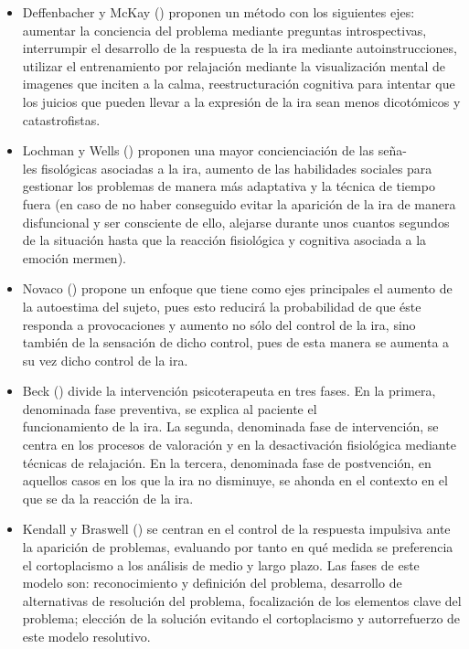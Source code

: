 \begin{itemize}
    \item Deffenbacher y McKay (\citeyear{deffenbacher1996expression}) proponen un método con los siguientes ejes: aumentar la conciencia del problema mediante preguntas introspectivas, interrumpir el desarrollo de la respuesta de la ira mediante autoinstrucciones, utilizar el entrenamiento por relajación mediante la visualización mental de imagenes que inciten a la calma, reestructuración cognitiva para intentar que los juicios que pueden llevar a la expresión de la ira sean menos dicotómicos y catastrofistas.

    \item Lochman y Wells (\citeyear{lochman1996social}) proponen una mayor concienciación de las seña- \\ les fisológicas asociadas a la ira, aumento de las habilidades sociales para gestionar los problemas de manera más adaptativa y la técnica de tiempo fuera (en caso de no haber conseguido evitar la aparición de la ira de manera disfuncional y ser consciente de ello, alejarse durante unos cuantos segundos de la situación hasta que la reacción fisiológica y cognitiva asociada a la emoción mermen).

    \item Novaco (\citeyear{novaco2003novaco}) propone un enfoque que tiene como ejes principales el aumento de la autoestima del sujeto, pues esto reducirá la probabilidad de que éste responda a provocaciones \citep{rosenbaum1960direct} \citep{veldman1961defensiveness} y aumento no sólo del control de la ira, sino también de la sensación de dicho control, pues de esta manera se aumenta a su vez dicho control de la ira.

    \item Beck (\citeyear{beck1998cognitive}) divide la intervención psicoterapeuta en tres fases. En la primera, denominada fase preventiva, se explica al paciente el \\ funcionamiento de la ira. La segunda, denominada fase de intervención, se centra en los procesos de valoración y en la desactivación fisiológica mediante técnicas de relajación. En la tercera, denominada fase de postvención, en aquellos casos en los que la ira no disminuye, se ahonda en el contexto en el que se da la reacción de la ira.
    
    \item Kendall y Braswell (\citeyear{braswell1985involvement}) se centran en el control de la respuesta impulsiva ante la aparición de problemas, evaluando por tanto en qué medida se preferencia el cortoplacismo a los análisis de medio y largo plazo. Las fases de este modelo son: reconocimiento y definición del problema, desarrollo de alternativas de resolución del problema, focalización de los elementos clave del problema; elección de la solución evitando el cortoplacismo y autorrefuerzo de este modelo resolutivo.
    

\end{itemize}
